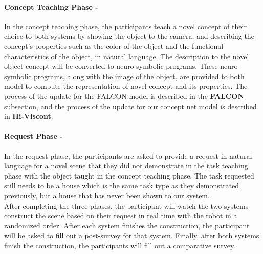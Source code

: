 \paragraph{Concept Teaching Phase - } In the concept teaching phase, the participants teach a novel concept of their choice to both systems by showing the object to the camera, and describing the concept's properties such as the color of the object and the functional characteristics of the object, in natural language. 
The description to the novel object concept will be converted to neuro-symbolic programs. These neuro-symbolic programs, along with the image of the object, are provided to both model to compute the representation of novel concept and its properties. The process of the update for the FALCON model is described in the \textbf{FALCON} subsection, and the process of the update for our concept net model is described in \textbf{Hi-Viscont}.

\paragraph{Request Phase - } In the request phase, the participants are asked to provide a request in natural language for a novel scene that they did not demonstrate in the task teaching phase with the object taught in the concept teaching phase. The task requested still needs to be a house which is the same task type as they demonstrated previously, but a house that has never been shown to our system.
\\

After completing the three phases, the participant will watch the two systems construct the scene based on their request in real time with the robot in a randomized order. 
After each system finishes the construction, the participant will be asked to fill out a post-survey for that system.
Finally, after both systems finish the construction, the participants will fill out a comparative survey.


